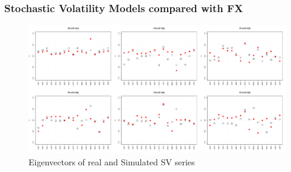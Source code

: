 \documentclass{beamer}
\begin{document}
\begin{frame}
  \frametitle{Stochastic Volatility Models compared with FX}
  \begin{figure}[htb!]
    \centering
    \includegraphics[width=1.0\linewidth]{FX_sv_eigenvectors.pdf}
    \caption{\scriptsize Eigenvectors of real and Simulated SV series}
  \end{figure}
\end{frame}
\end{document}
